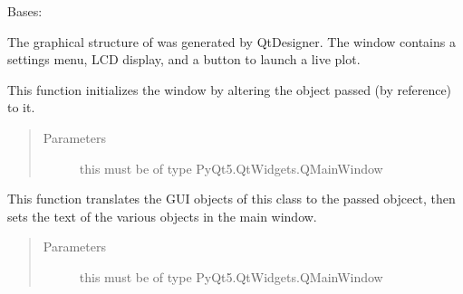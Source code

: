 \documentclass[letterpaper,10pt,english]{sphinxmanual}
\begin{document}
\begin{fulllineitems}
\label{\detokenize{mainWindow:mainWindow.Ui_MainWindow}}
Bases: 

The graphical structure of  was generated by QtDesigner. The window contains a settings menu,
LCD display, and a button to launch a live plot.

\begin{fulllineitems}
\label{\detokenize{mainWindow:mainWindow.Ui_MainWindow.setupUi}}
This function initializes the window by altering the  object passed (by reference) to it.
\begin{quote}\begin{description}
\item[{Parameters}] \leavevmode
{} \textendash{} this must be of type PyQt5.QtWidgets.QMainWindow

\end{description}\end{quote}

\end{fulllineitems}


\begin{fulllineitems}
\label{\detokenize{mainWindow:mainWindow.Ui_MainWindow.retranslateUi}}
This function translates the GUI objects of this class to the passed  objcect,
then sets the text of the various objects in the main window.
\begin{quote}\begin{description}
\item[{Parameters}] \leavevmode
{} \textendash{} this must be of type PyQt5.QtWidgets.QMainWindow

\end{description}\end{quote}


\end{fulllineitems}
\end{fulllineitems}
\end{document}
